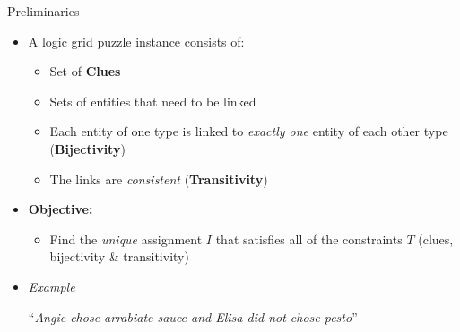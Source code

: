 \documentclass{beamer}
\begin{document}
\begin{frame}{Preliminaries}
    \begin{itemize}
        \item A logic grid puzzle instance consists of:
              \begin{itemize}
                \item Set of \textbf{Clues}
                  \item Sets of entities that need to be linked
                  \item Each entity of one type is linked to \textit{exactly one} entity of each other type (\textbf{Bijectivity})
                  \item The links are \textit{consistent} (\textbf{Transitivity})
              \end{itemize}\pause
              \vfill
              \item  \textbf{Objective:}
              \begin{itemize}\small
                \item Find the \textit{unique} assignment $I$ that satisfies all of the constraints $T$ (clues, bijectivity \& transitivity)
            \end{itemize}\pause
            \vfill
        \item \textit{Example}
              \begin{center}
                  \small``\textit{Angie chose arrabiate sauce and Elisa did not chose pesto}'' \\
              \end{center}
    \end{itemize}\pause

\end{frame}
\end{document}
